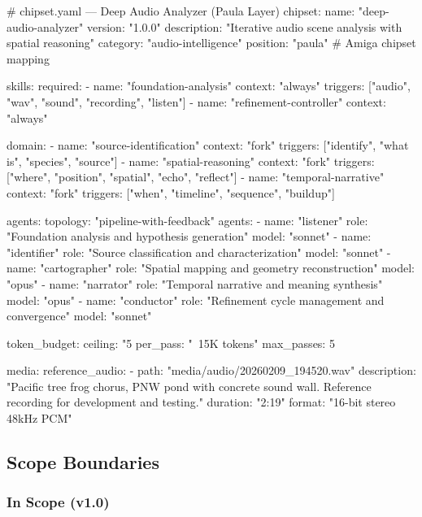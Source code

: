 \documentclass[11pt,letterpaper]{article}
\begin{document}
\begin{asciibox}
# chipset.yaml — Deep Audio Analyzer (Paula Layer)
chipset:
  name: "deep-audio-analyzer"
  version: "1.0.0"
  description: "Iterative audio scene analysis with spatial reasoning"
  category: "audio-intelligence"
  position: "paula"  # Amiga chipset mapping

skills:
  required:
    - name: "foundation-analysis"
      context: "always"
      triggers: ["audio", "wav", "sound", "recording", "listen"]
    - name: "refinement-controller"
      context: "always"

  domain:
    - name: "source-identification"
      context: "fork"
      triggers: ["identify", "what is", "species", "source"]
    - name: "spatial-reasoning"
      context: "fork"
      triggers: ["where", "position", "spatial", "echo", "reflect"]
    - name: "temporal-narrative"
      context: "fork"
      triggers: ["when", "timeline", "sequence", "buildup"]

agents:
  topology: "pipeline-with-feedback"
  agents:
    - name: "listener"
      role: "Foundation analysis and hypothesis generation"
      model: "sonnet"
    - name: "identifier"
      role: "Source classification and characterization"
      model: "sonnet"
    - name: "cartographer"
      role: "Spatial mapping and geometry reconstruction"
      model: "opus"
    - name: "narrator"
      role: "Temporal narrative and meaning synthesis"
      model: "opus"
    - name: "conductor"
      role: "Refinement cycle management and convergence"
      model: "sonnet"

token_budget:
  ceiling: "5%
  per_pass: "~15K tokens"
  max_passes: 5

media:
  reference_audio:
    - path: "media/audio/20260209_194520.wav"
      description: "Pacific tree frog chorus, PNW pond with
                     concrete sound wall. Reference recording
                     for development and testing."
      duration: "2:19"
      format: "16-bit stereo 48kHz PCM"
\end{asciibox}

\subsection{Scope Boundaries}

\subsubsection{In Scope (v1.0)}
\end{document}
